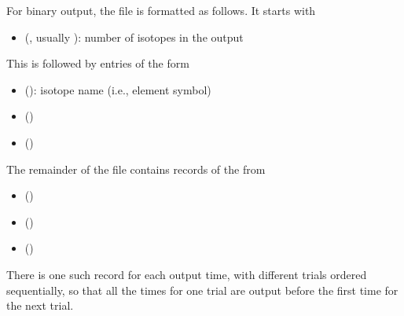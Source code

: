 \documentclass[letterpaper,10pt,english]{sphinxmanual}
\begin{document}
For binary output, the file is formatted as follows. It starts with
\begin{itemize}
\item {} 
 (, usually ): number of isotopes in the output

\end{itemize}

This is followed by  entries of the form
\begin{itemize}
\item {} 
 (): isotope name (i.e., element symbol)

\item {} 
 ()

\item {} 
 ()

\end{itemize}

The remainder of the file contains records of the from
\begin{itemize}
\item {} 
 ()

\item {} 
 ()

\item {} 
 ()

\end{itemize}

There is one such record for each output time, with different trials
ordered sequentially, so that all the times for one trial are output
before the first time for the next trial.
\end{document}
